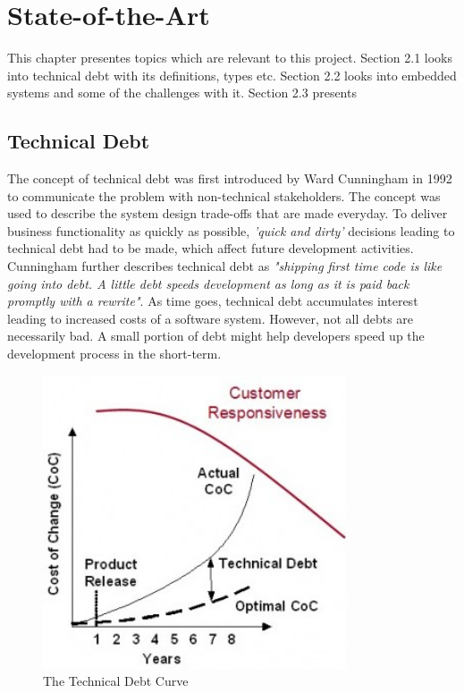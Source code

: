 \chapter{State-of-the-Art}
This chapter presentes topics which are relevant to this project. Section 2.1 looks into technical debt with its definitions, types etc. Section 2.2 looks into embedded systems and some of the challenges with it. Section 2.3 presents 


\section{Technical Debt}
The concept of technical debt was first introduced by Ward Cunningham in 1992 to communicate the problem with non-technical stakeholders\cite{p29-cunningham}. The concept was used to describe the system design trade-offs that are made everyday. To deliver business functionality as quickly as possible, \textit{'quick and dirty'} decisions leading to technical debt had to be made, which affect future development activities. Cunningham further describes technical debt as \textit{"shipping first time code is like going into debt. A little debt speeds development as long as it is paid back promptly with a rewrite"}. As time goes, technical debt accumulates interest leading to increased costs of a software system\cite{p31-guo,p35-klinger}. However, not all debts are necessarily bad. A small portion of debt might help developers speed up the development process in the short-term\cite{p31-guo}. 


\begin{figure}[ht!]
	\centering
	\includegraphics[width=0.8\textwidth]{images/techdebtCurve.jpg}
	\caption{The Technical Debt Curve\cite{jim-highsmith}}
	\label{fig:techDebtCurve}
\end{figure}

